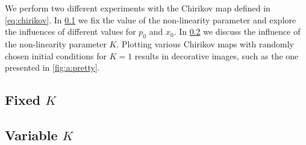 
We perform two different experiments with the Chirikov map defined in \cref{eq:chirikov}. In \cref{ss:fixed} we fix the value of the non-linearity parameter and explore the influences of different values for $p_0$ and $x_0$. In \cref{ss:variable} we discuss the influence of the non-linearity parameter $K$. Plotting various Chirikov maps with randomly chosen initial conditions for $K = 1$ results in decorative images, such as the one presented in \cref{fig:a:pretty}.

\subsection[]{Fixed $K$}
\label{ss:fixed}


\subsection[]{Variable $K$}
\label{ss:variable}
